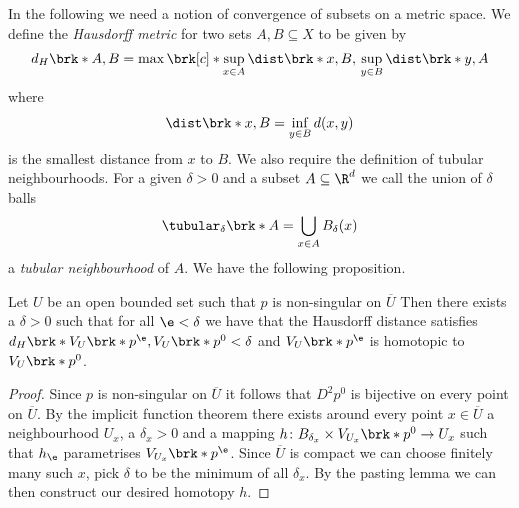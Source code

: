 In the following we need a notion of convergence of subsets on a metric space.
We define the \emph{Hausdorff metric} for two sets $A,B\subseteq X$ to be given by 
\begin{align}
  d_H\brk*{A,B}=\max\brk[c]*{\sup_{x\in A}\dist\brk*{x,B},\,\sup_{y\in B}\dist\brk*{y,A}}
  \label{eq:def_HausdorffMetric}
\end{align}
where
\begin{align}
  \dist\brk*{x,B}=\inf_{y\in B}d(x,y)\label{eq:def_distance}
\end{align}
is the smallest distance from $x$ to $B$.
We also require the definition of tubular neighbourhoods.
For a given $\delta>0$ and a subset $A\subseteq\R^d$ we call the union of $\delta$ balls
\begin{align}
  \tubular_\delta\brk*{A}=\bigcup_{x\in A}B_\delta(x)\label{eq:def_tubularNbh}
\end{align}
a \emph{tubular neighbourhood} of $A$.
We have the following proposition.
\begin{proposition}
  Let $U$ be an open bounded set such that $p$ is non-singular on $\overline{U}$
  Then there exists a $\delta>0$ such that for all $\e<\delta$
  we have that the Hausdorff distance satisfies 
  $d_H\brk*{V_U\brk*{p^\e},V_U\brk*{p^0}}<\delta$ and 
  $V_U\brk*{p^\e}$ is homotopic to $V_U\brk*{p^0}$.
\end{proposition}
\begin{proof}
  Since $p$ is non-singular on $\overline{U}$ it follows that $D^2p^0$ is bijective on every point on
  $\overline{U}$.
  By the implicit function theorem there exists around every point $x\in\overline{U}$
  a neighbourhood $U_x$, a $\delta_x>0$ and 
  a mapping $h\colon B_{\delta_x}\times V_{U_x}\brk*{p^0}\to U_x$ such that $h_\e$ parametrises
  $V_{U_x}\brk*{p^\e}$. Since $\overline{U}$ is compact we can choose finitely many such $x$,
  pick $\delta$ to be the minimum of all $\delta_x$. By the pasting lemma we can then construct
  our desired homotopy $h$.
\end{proof}

